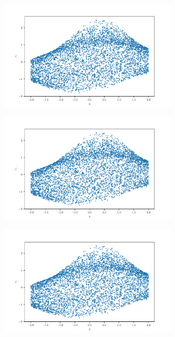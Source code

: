 \documentclass[10pt,a4paper]{article}
\begin{document}
\begin{figure}[!ht]
\begin{subfigure}{0.3\textwidth}
	\caption{}
	\label{fig_xz2}
\end{subfigure}
\begin{subfigure}{0.3\textwidth}
	\centering	
	\includegraphics[width=\textwidth]{square_y_z1.pdf}
	\caption{}
	\label{fig_yz0}
\end{subfigure}
\begin{subfigure}{0.3\textwidth}
	\centering
	\includegraphics[width=\textwidth] {square_y_z1.pdf}
	\caption{}
	\label{fig_yz1}
\end{subfigure}
\begin{subfigure}{0.3\textwidth}
	\centering	
	\includegraphics[width=\textwidth]{square_y_z1.pdf}

\end{subfigure}
\end{figure}
\end{document}
